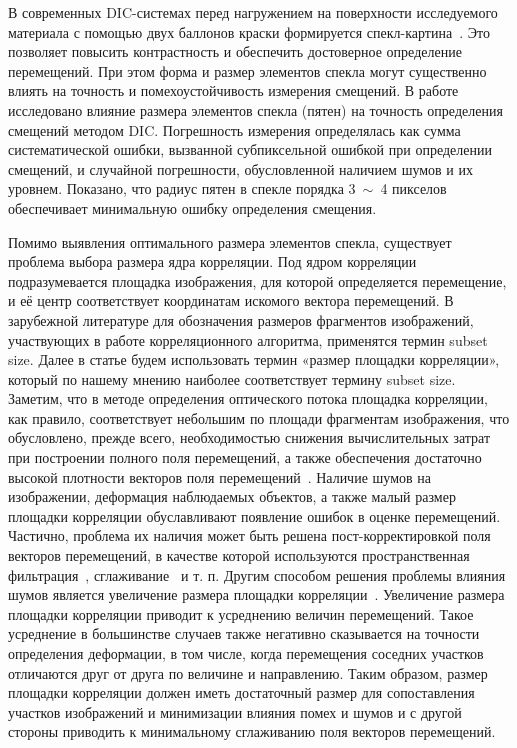 \documentclass[a4paper]{jctart10}
\begin{document}
В современных DIC-системах перед нагружением на поверхности исследуемого материала с помощью двух баллонов краски формируется спекл-картина~\cite{1}. Это позволяет повысить контрастность и обеспечить достоверное определение перемещений. При этом форма и размер элементов спекла могут существенно влиять на точность и помехоустойчивость измерения смещений. В работе~\cite{4} исследовано влияние размера элементов спекла (пятен) на точность определения смещений методом DIC. Погрешность измерения определялась как сумма систематической ошибки, вызванной субпиксельной ошибкой при определении смещений, и случайной погрешности, обусловленной наличием шумов и их уровнем. Показано, что радиус пятен в спекле порядка 3~$\sim$~4 пикселов обеспечивает минимальную ошибку определения смещения.

Помимо выявления оптимального размера элементов спекла, существует проблема выбора размера ядра корреляции. Под ядром корреляции подразумевается площадка изображения, для которой определяется перемещение, и её центр соответствует координатам искомого вектора перемещений. В зарубежной литературе для обозначения размеров фрагментов изображений, участвующих в работе корреляционного алгоритма, применятся термин subset size. Далее в статье будем использовать термин «размер площадки корреляции», который по нашему мнению наиболее соответствует термину subset size. Заметим, что в методе определения оптического потока площадка корреляции, как правило, соответствует небольшим по площади фрагментам изображения, что обусловлено, прежде всего, необходимостью снижения вычислительных затрат при построении полного поля перемещений, а также обеспечения достаточно высокой плотности векторов поля перемещений~\cite{5, 6, 7}. Наличие шумов на изображении, деформация наблюдаемых объектов, а также малый размер площадки корреляции обуславливают появление ошибок в оценке перемещений. Частично, проблема их наличия может быть решена пост-корректировкой поля векторов перемещений, в качестве которой используются пространственная фильтрация~\cite{8}, сглаживание~\cite{9} и т. п. Другим способом решения проблемы влияния шумов является увеличение размера площадки корреляции~\cite{10, 11}. Увеличение размера площадки корреляции приводит к усреднению величин перемещений. Такое усреднение в большинстве случаев также негативно сказывается на точности определения деформации, в том числе, когда перемещения соседних участков отличаются друг от друга по величине и направлению. Таким образом, размер площадки корреляции должен иметь достаточный размер для сопоставления участков изображений и минимизации влияния помех и шумов и с другой стороны приводить к минимальному сглаживанию поля векторов перемещений.
\end{document}
